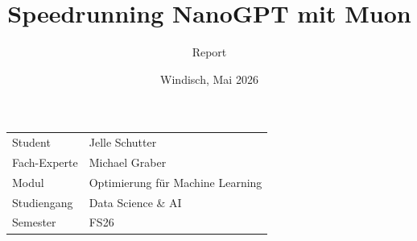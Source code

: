 \documentclass[final]{fhnwreport}         %
\title{Speedrunning NanoGPT mit Muon}  %
\author{Report}    %
\date{Windisch, Mai 2026}               %
\begin{document}

\maketitle



\vspace*{10ex}

\begin{center}
\begin{tabular}{@{}p{5cm} l}
Student                    &    Jelle Schutter\\[2ex]
Fach-Experte               &    Michael Graber\\[2ex]
Modul                      &    Optimierung für Machine Learning\\[2ex]
Studiengang                &    Data Science \& AI \\[2ex]
Semester                   &    FS26\\[2ex]
\end{tabular}
\end{center}



\vspace*{4ex}

\clearpage
			
% 

\tableofcontents
\clearpage
\end{document}
